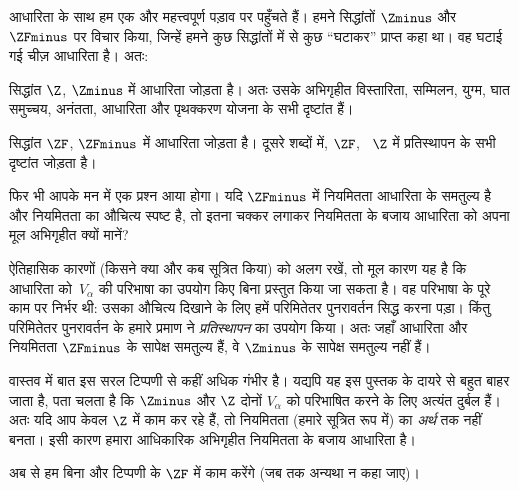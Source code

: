 \documentclass[../../../include/open-logic-section]{subfiles}
\begin{document}

आधारिता के साथ हम एक और महत्त्वपूर्ण पड़ाव पर पहुँचते हैं। हमने सिद्धांतों
$\Zminus$ और $\ZFminus$ पर विचार किया, जिन्हें हमने कुछ सिद्धांतों में से
कुछ ``घटाकर'' प्राप्त कहा था। वह घटाई गई चीज़ आधारिता है। अतः:

\begin{defn}
सिद्धांत $\Z$, $\Zminus$ में आधारिता जोड़ता है। अतः उसके अभिगृहीत विस्तारिता,
सम्मिलन, युग्म, घात समुच्चय, अनंतता, आधारिता और पृथक्करण योजना के सभी
दृष्टांत हैं।

सिद्धांत $\ZF$, $\ZFminus$ में आधारिता जोड़ता है। दूसरे शब्दों में, $\ZF$,
~$\Z$ में प्रतिस्थापन के सभी दृष्टांत जोड़ता है।
\end{defn}

फिर भी आपके मन में एक प्रश्न आया होगा। यदि $\ZFminus$ में नियमितता आधारिता
के समतुल्य है और नियमितता का औचित्य स्पष्ट है, तो इतना चक्कर लगाकर नियमितता
के बजाय आधारिता को अपना मूल अभिगृहीत क्यों मानें?

ऐतिहासिक कारणों (किसने क्या और कब सूत्रित किया) को अलग रखें, तो मूल कारण यह
है कि आधारिता को~$V_\alpha$ की परिभाषा का उपयोग किए बिना प्रस्तुत किया जा
सकता है। वह परिभाषा  के पूरे काम पर निर्भर थी: उसका
औचित्य दिखाने के लिए हमें परिमितेतर पुनरावर्तन सिद्ध करना पड़ा। किंतु
परिमितेतर पुनरावर्तन के हमारे प्रमाण ने \emph{प्रतिस्थापन} का उपयोग किया।
अतः जहाँ आधारिता और नियमितता $\ZFminus$ के सापेक्ष समतुल्य हैं, वे
$\Zminus$ के सापेक्ष समतुल्य नहीं हैं।

वास्तव में बात इस सरल टिप्पणी से कहीं अधिक गंभीर है। यद्यपि यह इस पुस्तक के
दायरे से बहुत बाहर जाता है, पता चलता है कि $\Zminus$ और $\Z$ दोनों
$V_\alpha$ को परिभाषित करने के लिए अत्यंत दुर्बल हैं। अतः यदि आप केवल $\Z$
में काम कर रहे हैं, तो नियमितता (हमारे सूत्रित रूप में) का \emph{अर्थ} तक
नहीं बनता। इसी कारण हमारा आधिकारिक अभिगृहीत नियमितता के बजाय आधारिता है।

अब से हम बिना और टिप्पणी के $\ZF$ में काम करेंगे (जब तक अन्यथा न कहा जाए)।
\end{document}
